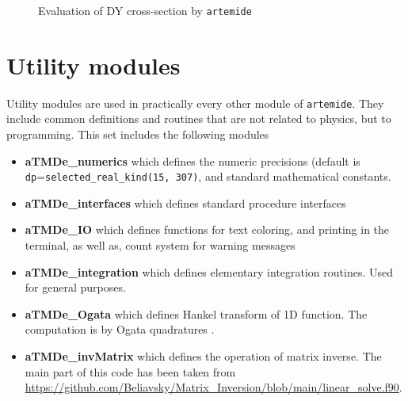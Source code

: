 \documentclass[prd,nofootinbib,eqsecnum,final]{revtex4}
\renewcommand{\(}{\left(}
\renewcommand{\)}{\right)}
\renewcommand{\[}{\left[}
\renewcommand{\]}{\right]}
\begin{document}
\begin{figure}
\begin{center}
\end{center}
\caption{\label{fig:order_of_evaluation} {\Large Evaluation of DY cross-section by \texttt{artemide}}}
\end{figure}

\newpage
\section{Utility modules}
\label{untility}

Utility modules are used in practically every other module of \texttt{artemide}. They include common definitions and routines that are not related to physics, but to programming. This set includes the following modules
\begin{itemize}
\item \textbf{aTMDe\_numerics} which defines the numeric precisions (default is \texttt{dp}=\texttt{selected\_real\_kind(15, 307)}, and standard mathematical constants.
\item \textbf{aTMDe\_interfaces} which defines standard procedure interfaces
\item \textbf{aTMDe\_IO} which defines functions for text coloring, and printing in the terminal, as well as, count system for warning messages
\item \textbf{aTMDe\_integration} which defines elementary integration routines. Used for general purposes.
\item \textbf{aTMDe\_Ogata} which defines Hankel transform of 1D function. The computation is by Ogata quadratures \cite{Ogata2005ANI}.
\item \textbf{aTMDe\_invMatrix} which defines the operation of matrix inverse. The main part of this code has been taken from \href{https://github.com/Beliavsky/Matrix_Inversion/blob/main/linear_solve.f90}{https://github.com/Beliavsky/Matrix\_Inversion/blob/main/linear\_solve.f90}.
\end{itemize}
\end{document}

